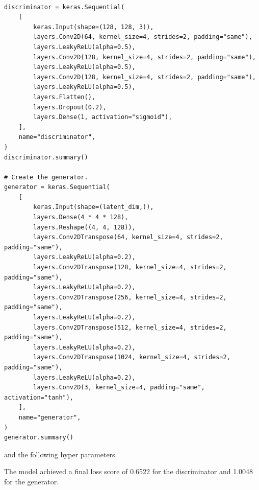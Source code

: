 \begin{verbatim}

discriminator = keras.Sequential(
    [
        keras.Input(shape=(128, 128, 3)),
        layers.Conv2D(64, kernel_size=4, strides=2, padding="same"),
        layers.LeakyReLU(alpha=0.5),
        layers.Conv2D(128, kernel_size=4, strides=2, padding="same"),
        layers.LeakyReLU(alpha=0.5),
        layers.Conv2D(128, kernel_size=4, strides=2, padding="same"),
        layers.LeakyReLU(alpha=0.5),
        layers.Flatten(),
        layers.Dropout(0.2),
        layers.Dense(1, activation="sigmoid"),
    ],
    name="discriminator",
)
discriminator.summary()

# Create the generator.
generator = keras.Sequential(
    [
        keras.Input(shape=(latent_dim,)),
        layers.Dense(4 * 4 * 128),
        layers.Reshape((4, 4, 128)),
        layers.Conv2DTranspose(64, kernel_size=4, strides=2, padding="same"),
        layers.LeakyReLU(alpha=0.2),
        layers.Conv2DTranspose(128, kernel_size=4, strides=2, padding="same"),
        layers.LeakyReLU(alpha=0.2),
        layers.Conv2DTranspose(256, kernel_size=4, strides=2, padding="same"),
        layers.LeakyReLU(alpha=0.2),
        layers.Conv2DTranspose(512, kernel_size=4, strides=2, padding="same"),
        layers.LeakyReLU(alpha=0.2),
        layers.Conv2DTranspose(1024, kernel_size=4, strides=2, padding="same"),
        layers.LeakyReLU(alpha=0.2),
        layers.Conv2D(3, kernel_size=4, padding="same", activation="tanh"),
    ],
    name="generator",
)
generator.summary()
\end{verbatim}
and the following hyper parameters 
\begin{table}[H]
    \centering
    \caption{DCGAN for Producing Synthetic CT Non COVID Class Data for Extensive COVID 19 Dataset}
    \label{tab:DCGAN for Producing Synthetic CT Non COVID Class Data for Extensive COVID 19 Dataset}
\end{table}
The model achieved a final loss score of 0.6522 for the discriminator and 1.0048 for the generator.
